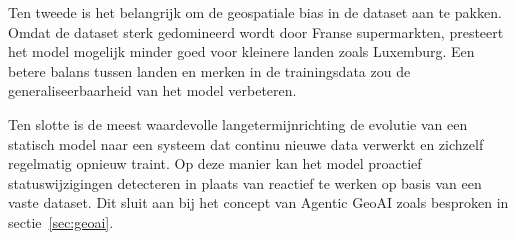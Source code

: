 Ten tweede is het belangrijk om de geospatiale bias in de dataset aan te pakken. Omdat de dataset sterk gedomineerd wordt door Franse supermarkten, presteert het model mogelijk minder goed voor kleinere landen zoals Luxemburg. Een betere balans tussen landen en merken in de trainingsdata zou de generaliseerbaarheid van het model verbeteren.

Ten slotte is de meest waardevolle langetermijnrichting de evolutie van een statisch model naar een systeem dat continu nieuwe data verwerkt en zichzelf regelmatig opnieuw traint. Op deze manier kan het model proactief statuswijzigingen detecteren in plaats van reactief te werken op basis van een vaste dataset. Dit sluit aan bij het concept van Agentic GeoAI zoals besproken in sectie~\ref{sec:geoai}.


